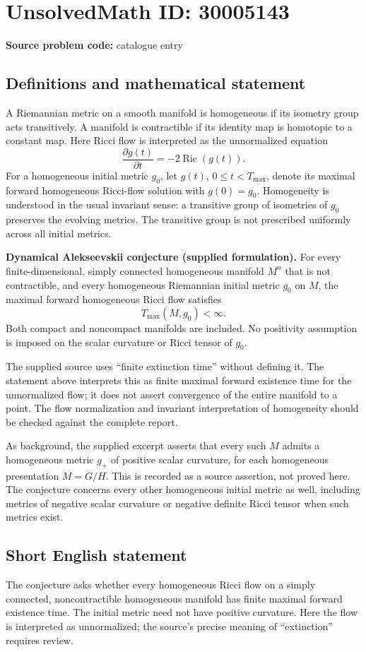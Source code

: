 \documentclass[11pt]{article}
\begin{document}
\section*{UnsolvedMath ID: 30005143}
\textbf{Source problem code:} catalogue entry
\subsection{Definitions and mathematical statement}
A Riemannian metric on a smooth manifold is homogeneous if its isometry group acts transitively. A manifold is contractible if its identity map is homotopic to a constant map. Here Ricci flow is interpreted as the unnormalized equation
\[
\frac{\partial g(t)}{\partial t}=-2\operatorname{Ric}(g(t)).
\]
For a homogeneous initial metric \(g_0\), let \(g(t)\), \(0\leq t<T_{\max}\), denote its maximal forward homogeneous Ricci-flow solution with \(g(0)=g_0\). Homogeneity is understood in the usual invariant sense: a transitive group of isometries of \(g_0\) preserves the evolving metrics. The transitive group is not prescribed uniformly across all initial metrics.

\textbf{Dynamical Alekseevskii conjecture (supplied formulation).} For every finite-dimensional, simply connected homogeneous manifold \(M^n\) that is not contractible, and every homogeneous Riemannian initial metric \(g_0\) on \(M\), the maximal forward homogeneous Ricci flow satisfies
\[
T_{\max}(M,g_0)<\infty.
\]
Both compact and noncompact manifolds are included. No positivity assumption is imposed on the scalar curvature or Ricci tensor of \(g_0\).

The supplied source uses ``finite extinction time'' without defining it. The statement above interprets this as finite maximal forward existence time for the unnormalized flow; it does not assert convergence of the entire manifold to a point. The flow normalization and invariant interpretation of homogeneity should be checked against the complete report.

As background, the supplied excerpt asserts that every such \(M\) admits a homogeneous metric \(g_+\) of positive scalar curvature, for each homogeneous presentation \(M=G/H\). This is recorded as a source assertion, not proved here. The conjecture concerns every other homogeneous initial metric as well, including metrics of negative scalar curvature or negative definite Ricci tensor when such metrics exist.
\subsection{Short English statement}
The conjecture asks whether every homogeneous Ricci flow on a simply connected, noncontractible homogeneous manifold has finite maximal forward existence time. The initial metric need not have positive curvature. Here the flow is interpreted as unnormalized; the source's precise meaning of ``extinction'' requires review.
\end{document}
